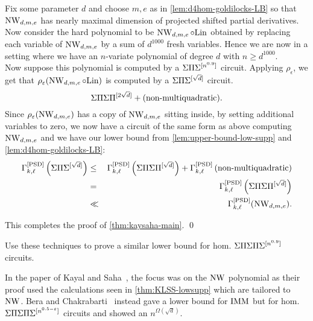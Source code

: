Fix some parameter $d$ and choose $m,e$ as in \autoref{lem:d4hom-goldilocks-LB} so that $\operatorname{\mathrm{NW}}_{d,m,e}$ has nearly maximal dimension of projected shifted partial derivatives. Now consider the hard polynomial to be $\operatorname{\mathrm{NW}}_{d,m,e} \circ \mathrm{Lin}$ obtained by replacing each variable of $\operatorname{\mathrm{NW}}_{d,m,e}$ by a sum of $d^{1000}$ fresh variables. Hence we are now in a setting where we have an $n$-variate polynomial of degree $d$ with $n \geq d^{1000}$. \\

Now suppose this polynomial is computed by a $\Sigma\Pi\Sigma^{[n^{0.9}]}$ circuit. Applying $\rho_\epsilon$, we get that $\rho_\varepsilon(\operatorname{\mathrm{NW}}_{d,m,e} \circ \mathrm{Lin})$ is computed by a $\Sigma\Pi\Sigma^{[\sqrt{d}]}$ circuit.  
\[
\Sigma\Pi\Sigma\Pi^{[2\sqrt{d}]} + (\text{non-multiquadratic}).
\]
Since $\rho_\varepsilon(\operatorname{\mathrm{NW}}_{d,m,e})$ has a copy of $\operatorname{\mathrm{NW}}_{d,m,e}$ sitting inside, by setting additional variables to zero, we now have a circuit of the same form as above computing $\operatorname{\mathrm{NW}}_{d,m,e}$ and we have our lower bound from \autoref{lem:upper-bound-low-supp} and \autoref{lem:d4hom-goldilocks-LB}:
\begin{eqnarray*}
\Gamma^{\mathrm{[PSD]}}_{k,\ell}\left(\Sigma\Pi\Sigma^{[\sqrt{d}]}\right) & \leq& \Gamma^{\mathrm{[PSD]}}_{k,\ell}\left(\Sigma\Pi\Sigma\Pi^{[\sqrt{d}]}\right) + \Gamma^{\mathrm{[PSD]}}_{k,\ell}\left(\text{non-multiquadratic}\right) \\
& = & \Gamma^{\mathrm{[PSD]}}_{k,\ell}\left(\Sigma\Pi\Sigma\Pi^{[\sqrt{d}]}\right)\\
&\ll &\Gamma^{\mathrm{[PSD]}}_{k,\ell}(\operatorname{\mathrm{NW}}_{d,m,e}). 
\end{eqnarray*}

This completes the proof of \autoref{thm:kaysaha-main}. \qed

\begin{exercise}
Use these techniques to prove a similar lower bound for hom. $\Sigma\Pi\Sigma\Pi\Sigma^{[n^{0.9}]}$ circuits. 
\end{exercise}


\begin{remark*}
In the paper of Kayal and Saha~\cite{KayalSaha14}, the focus was on the $\operatorname{\mathrm{NW}}$ polynomial as their proof used the calculations seen in \autoref{thm:KLSS-lowsupp} which are tailored to $\operatorname{\mathrm{NW}}$. 
Bera and Chakrabarti~\cite{BC15} instead gave a lower bound for $\operatorname{\mathrm{IMM}}$ but for hom. $\Sigma\Pi\Sigma\Pi\Sigma^{[n^{0.5 - \varepsilon}]}$ circuits and showed an $n^{\Omega(\sqrt{d})}$.
\end{remark*}

